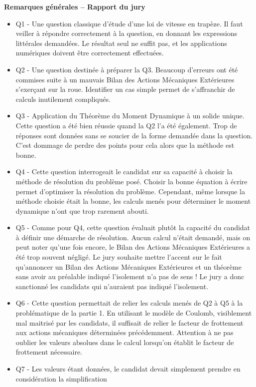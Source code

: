 \documentclass[10pt,fleqn]{article} %
\begin{document}
\textbf{Remarques générales -- Rapport du jury}
\begin{itemize}
\item Q1 - Une question classique d’étude d’une loi de vitesse en trapèze. Il faut veiller à répondre correctement
à la question, en donnant les expressions littérales demandées. Le résultat seul ne suffit pas, et les
applications numériques doivent être correctement effectuées.
\item Q2 - Une question destinée à préparer la Q3. Beaucoup d’erreurs ont été commises suite à un mauvais
Bilan des Actions Mécaniques Extérieures s’exerçant sur la roue. Identifier un cas simple permet de
s’affranchir de calculs inutilement compliqués.
\item Q3 - Application du Théorème du Moment Dynamique à un solide unique. Cette question a été bien
réussie quand la Q2 l’a été également. Trop de réponses sont données sans se soucier de la forme
demandée dans la question. C’est dommage de perdre des points pour cela alors que la méthode est
bonne.
\item Q4 - Cette question interrogeait le candidat sur sa capacité à choisir la méthode de résolution du
problème posé. Choisir la bonne équation à écrire permet d’optimiser la résolution du problème.
Cependant, même lorsque la méthode choisie était la bonne, les calculs menés pour déterminer le
moment dynamique n’ont que trop rarement abouti.
\item Q5 - Comme pour Q4, cette question évaluait plutôt la capacité du candidat à définir une démarche
de résolution. Aucun calcul n’était demandé, mais on peut noter qu’une fois encore, le Bilan des
Actions Mécaniques Extérieures a été trop souvent négligé. Le jury souhaite mettre l’accent sur le
fait qu’annoncer un Bilan des Actions Mécaniques Extérieures et un théorème sans avoir au préalable
indiqué l’isolement n’a pas de sens ! Le jury a donc sanctionné les candidats qui n’auraient pas indiqué
l’isolement.
\item Q6 - Cette question permettait de relier les calculs menés de Q2 à Q5 à la problématique de la partie
1. En utilisant le modèle de Coulomb, visiblement mal maitrisé par les candidats, il suffisait de relier le
facteur de frottement aux actions mécaniques déterminées précédemment. Attention à ne pas oublier
les valeurs absolues dans le calcul lorsqu’on établit le facteur de frottement nécessaire.
\item Q7 - Les valeurs étant données, le candidat devait simplement prendre en considération la simplification

\end{itemize}
\end{document}
